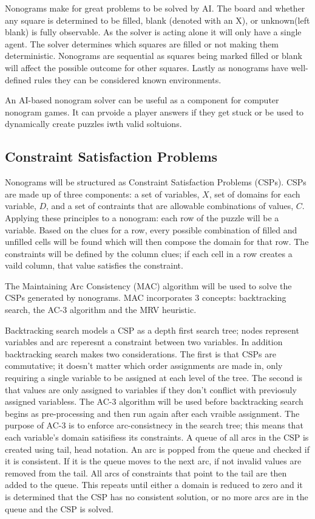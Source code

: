 \documentclass[12pt, letterpaper]
{article}
\begin{document}
    Nonograms make for great problems to be solved by AI. The board and whether any square is determined to be filled, blank (denoted with an X), or unknown(left blank) is fully observable. As the solver is acting alone it will only have a single agent. The solver determines which squares are filled or not making them deterministic. Nonograms are sequential as squares being marked filled or blank will affect the possible outcome for other squares. Lastly as nonograms have well-defined rules they can be considered known environments. 
    
    An AI-based nonogram solver can be useful as a component for computer nonogram games. It can prvoide a player answers if they get stuck or be used to dynamically create puzzles iwth valid soltuions.

    \subsection{Constraint Satisfaction Problems}
    Nonograms will be structured as Constraint Satisfaction Problems (CSPs). CSPs are made up of three components: a set of variables, $X$, set of domains for each variable, $D$, and a set of contraints that are allowable combinations of values, $C$. Applying these principles to a nonogram: each row of the puzzle will be a variable. Based on the clues for a row, every possible combination of filled and unfilled cells will be found which will then compose the domain for that row. The constraints will be defined by the column clues; if each cell in a row creates a vaild column, that value satisfies the constraint.

    The Maintaining Arc Consistency (MAC) algorithm will be used to solve the CSPs generated by nonograms. MAC incorporates 3 concepts: backtracking search, the AC-3 algorithm and the MRV heuristic.

    Backtracking search models a CSP as a depth first search tree; nodes represent variables and arc reperesnt a constraint between two variables. In addition backtracking search makes two considerations. The first is that CSPs are commutative; it doesn't matter which order assignments are made in, only requiring a single variable to be assigned at each level of the tree. The second is that values are only assigned to variables if they don't conflict with previosuly assigned variabless.
    The AC-3 algorithm will be used before backtracking search begins as pre-processing and then run again after each vraible assignment. The purpose of AC-3 is to enforce arc-consistnecy in the search tree; this means that each variable's domain satisifiess its constraints. A queue of all arcs in the CSP is created using tail, head notation. An arc is popped from the queue and checked if it is consistent. If it is the queue moves to the next arc, if not invalid values are removed from the tail. All arcs of constraints that point to the tail are then added to the queue. This repeats until either a domain is reduced to zero and it is determined that the CSP has no consistent solution, or no more arcs are in the queue and the CSP is solved.
\end{document}
